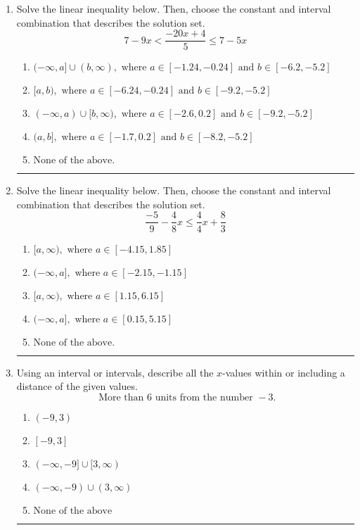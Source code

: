 \documentclass[14pt]{extbook}
\newcommand{\litem}[1]{\item#1\hspace*{-1cm}\rule{\textwidth}{0.4pt}}
\begin{document}
\begin{enumerate}
{\begin{enumerate}[label=\Alph*.]
\end{enumerate} }
\litem{
Solve the linear inequality below. Then, choose the constant and interval combination that describes the solution set.\[ 7 - 9 x < \frac{-20 x + 4}{5} \leq 7 - 5 x \]\begin{enumerate}[label=\Alph*.]
\item \( (-\infty, a] \cup (b, \infty), \text{ where } a \in [-1.24, -0.24] \text{ and } b \in [-6.2, -5.2] \)
\item \( [a, b), \text{ where } a \in [-6.24, -0.24] \text{ and } b \in [-9.2, -5.2] \)
\item \( (-\infty, a) \cup [b, \infty), \text{ where } a \in [-2.6, 0.2] \text{ and } b \in [-9.2, -5.2] \)
\item \( (a, b], \text{ where } a \in [-1.7, 0.2] \text{ and } b \in [-8.2, -5.2] \)
\item \( \text{None of the above.} \)

\end{enumerate} }
\litem{
Solve the linear inequality below. Then, choose the constant and interval combination that describes the solution set.\[ \frac{-5}{9} - \frac{4}{8} x \leq \frac{4}{4} x + \frac{8}{3} \]\begin{enumerate}[label=\Alph*.]
\item \( [a, \infty), \text{ where } a \in [-4.15, 1.85] \)
\item \( (-\infty, a], \text{ where } a \in [-2.15, -1.15] \)
\item \( [a, \infty), \text{ where } a \in [1.15, 6.15] \)
\item \( (-\infty, a], \text{ where } a \in [0.15, 5.15] \)
\item \( \text{None of the above}. \)

\end{enumerate} }
\litem{
Using an interval or intervals, describe all the $x$-values within or including a distance of the given values.\[ \text{ More than } 6 \text{ units from the number } -3. \]\begin{enumerate}[label=\Alph*.]
\item \( (-9, 3) \)
\item \( [-9, 3] \)
\item \( (-\infty, -9] \cup [3, \infty) \)
\item \( (-\infty, -9) \cup (3, \infty) \)
\item \( \text{None of the above} \)


\end{enumerate}}
\end{enumerate}
\end{document}

